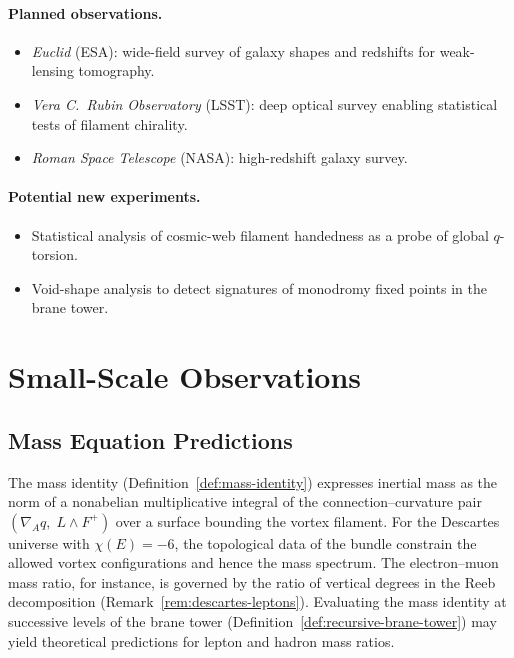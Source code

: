 \paragraph{Planned observations.}
\begin{itemize}
  \item \emph{Euclid} (ESA): wide-field survey of galaxy shapes and
        redshifts for weak-lensing tomography.
  \item \emph{Vera C.\ Rubin Observatory} (LSST): deep optical survey
        enabling statistical tests of filament chirality.
  \item \emph{Roman Space Telescope} (NASA): high-redshift galaxy survey.
\end{itemize}

\paragraph{Potential new experiments.}
\begin{itemize}
  \item Statistical analysis of cosmic-web filament handedness as a probe
        of global $q$-torsion.
  \item Void-shape analysis to detect signatures of monodromy fixed points
        in the brane tower.
\end{itemize}


\section{Small-Scale Observations}
\label{sec:small-scale}

\subsection{Mass Equation Predictions}
\label{sec:mass-predictions}

\begin{remark}
\label{rem:mass-ratio-predictions}
The mass identity (Definition~\ref{def:mass-identity}) expresses inertial mass
as the norm of a nonabelian multiplicative integral of the connection--curvature
pair $(\nabla_A q,\; L \wedge F^+)$ over a surface bounding the vortex
filament.  For the Descartes universe with $\chi(E) = -6$, the
topological data of the bundle constrain the allowed vortex configurations and
hence the mass spectrum.  The electron--muon mass ratio, for instance, is
governed by the ratio of vertical degrees in the Reeb decomposition
(Remark~\ref{rem:descartes-leptons}).  Evaluating the mass identity at
successive levels of the brane tower
(Definition~\ref{def:recursive-brane-tower}) may yield theoretical predictions
for lepton and hadron mass ratios.
\end{remark}

